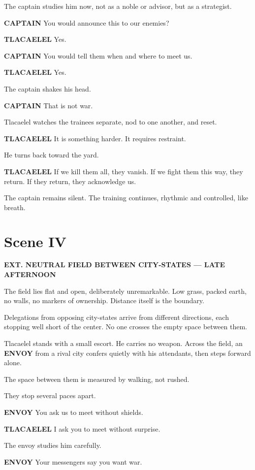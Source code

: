\documentclass[12pt]{article}
\begin{document}
The captain studies him now, not as a noble or advisor, but as a strategist.

\textbf{CAPTAIN}  
You would announce this to our enemies?

\textbf{TLACAELEL}  
Yes.

\textbf{CAPTAIN}  
You would tell them when and where to meet us.

\textbf{TLACAELEL}  
Yes.

The captain shakes his head.

\textbf{CAPTAIN}  
That is not war.

Tlacaelel watches the trainees separate, nod to one another, and reset.

\textbf{TLACAELEL}  
It is something harder. It requires restraint.

He turns back toward the yard.

\textbf{TLACAELEL}  
If we kill them all, they vanish.  
If we fight them this way, they return.  
If they return, they acknowledge us.

The captain remains silent. The training continues, rhythmic and controlled, like breath.

\section*{Scene IV}

\textbf{EXT. NEUTRAL FIELD BETWEEN CITY-STATES --- LATE AFTERNOON}

The field lies flat and open, deliberately unremarkable. Low grass, packed earth, no walls, no markers of ownership. Distance itself is the boundary.

Delegations from opposing city-states arrive from different directions, each stopping well short of the center. No one crosses the empty space between them.

Tlacaelel stands with a small escort. He carries no weapon. Across the field, an \textbf{ENVOY} from a rival city confers quietly with his attendants, then steps forward alone.

The space between them is measured by walking, not rushed.

They stop several paces apart.

\textbf{ENVOY}  
You ask us to meet without shields.

\textbf{TLACAELEL}  
I ask you to meet without surprise.

The envoy studies him carefully.

\textbf{ENVOY}  
Your messengers say you want war.
\end{document}
